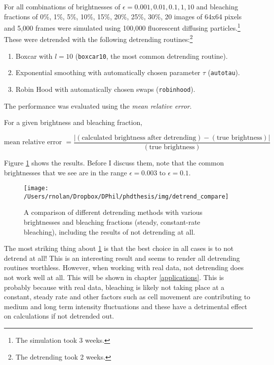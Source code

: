 \documentclass[12pt,]{book}
\providecommand{\tightlist}{%
  \setlength{\itemsep}{0pt}\setlength{\parskip}{0pt}}
\let\rmarkdownfootnote\footnote%
\def\footnote{\protect\rmarkdownfootnote}
\theoremstyle{definition}
\theoremstyle{definition}
\theoremstyle{definition}
\theoremstyle{remark}
\let\BeginKnitrBlock\begin \let\EndKnitrBlock\end
\begin{document}
For all combinations of brightnesses of
\(\epsilon = 0.001, 0.01, 0.1, 1, 10\) and bleaching fractions of 0\%,
1\%, 5\%, 10\%, 15\%, 20\%, 25\%, 30\%, 20 images of 64x64 pixels and
5,000 frames were simulated using 100,000 fluorescent diffusing
particles.\footnote{The simulation took 3 weeks.} These were detrended
with the following detrending routines:\footnote{The detrending took 2
  weeks.}

\begin{enumerate}
\def\labelenumi{\arabic{enumi}.}
\tightlist
\item
  Boxcar with \(l = 10\) (\texttt{boxcar10}, the most common detrending
  routine).
\item
  Exponential smoothing with automatically chosen parameter \(\tau\)
  (\texttt{autotau}).
\item
  Robin Hood with automatically chosen swaps (\texttt{robinhood}).
\end{enumerate}

The performance was evaluated using the \emph{mean relative error}.

\BeginKnitrBlock{definition}
\protect\hypertarget{def:unnamed-chunk-25}{}{\label{def:unnamed-chunk-25} }
For a given brightness and bleaching fraction,

\begin{equation}
\text{mean relative error } = \frac{|(\text{calculated brightness after detrending}) - (\text{true brightness})|}{(\text{true brightness})}
\label{eq:mean-relative-error}
\end{equation}
\EndKnitrBlock{definition}

Figure \ref{fig:detrend-compare} shows the results. Before I discuss
them, note that the common brightnesses that we see are in the range
\(\epsilon = 0.003\) to \(\epsilon = 0.1\).






\begin{figure}

\texttt{[image: /Users/rnolan/Dropbox/DPhil/phdthesis/img/detrend\_compare]} \hfill{}

\caption{A comparison of different detrending
methods with various brightnesses and bleaching fractions (steady,
constant-rate bleaching), including the results of not detrending at
all.}\label{fig:detrend-compare}
\end{figure}

The most striking thing about \ref{fig:detrend-compare} is that the best
choice in all cases is to not detrend at all! This is an interesting
result and seems to render all detrending routines worthless. However,
when working with real data, not detrending does not work well at all.
This will be shown in chapter \ref{applications}. This is probably
because with real data, bleaching is likely not taking place at a
constant, steady rate and other factors such as cell movement are
contributing to medium and long term intensity fluctuations and these
have a detrimental effect on calculations if not detrended out.
\end{document}
